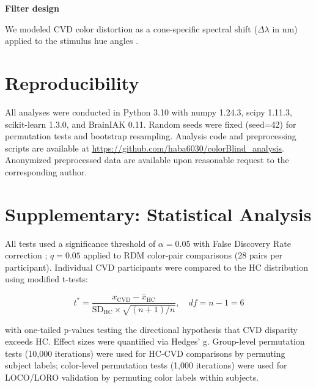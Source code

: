 \textbf{Filter design}

We modeled CVD color distortion as a cone-specific spectral shift ($\Delta\lambda$ in nm) applied to the stimulus hue angles \cite{brettel1997}.

\section{Reproducibility}

All analyses were conducted in Python 3.10 with numpy 1.24.3, scipy 1.11.3, scikit-learn 1.3.0, and BrainIAK 0.11. Random seeds were fixed (seed=42) for permutation tests and bootstrap resampling. Analysis code and preprocessing scripts are available at \url{https://github.com/haba6030/colorBlind_analysis}. Anonymized preprocessed data are available upon reasonable request to the corresponding author.

\section*{Supplementary: Statistical Analysis}

All tests used a significance threshold of $\alpha = 0.05$ with False Discovery Rate correction \cite{benjamini1995}; $q = 0.05$ applied to RDM color-pair comparisons (28 pairs per participant). Individual CVD participants were compared to the HC distribution using  modified t-tests:

\begin{equation}
t^* = \frac{x_{\text{CVD}} - \bar{x}_{\text{HC}}}{\text{SD}_{\text{HC}} \times \sqrt{(n+1)/n}}, \quad df = n-1 = 6
\end{equation}

with one-tailed p-values testing the directional hypothesis that CVD disparity exceeds HC. Effect sizes were quantified via Hedges' g. Group-level permutation tests (10,000 iterations) were used for HC-CVD comparisons by permuting subject labels; color-level permutation tests (1,000 iterations) were used for LOCO/LORO validation by permuting color labels within subjects.

